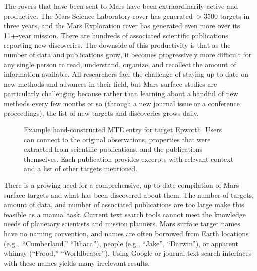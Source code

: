 \documentclass[letterpaper]{article}
\begin{document}
The rovers that have been sent to Mars have been extraordinarily
active and productive.  The Mars Science Laboratory rover has
generated $>3500$ targets in three years, and the Mars Exploration
rover has generated even more over its 11+-year mission.  There are
hundreds of associated scientific publications reporting new
discoveries.  The downside of this productivity is that as the number
of data and publications grow, it becomes progressively more difficult
for any single person to read, understand, organize, and recollect the
amount of information available.  All researchers face the challenge
of staying up to date on new methods and advances in their field, but
Mars surface studies are particularly challenging because rather than
learning about a handful of new methods every few months or so
(through a new journal issue or a conference proceedings), the list of
new targets and discoveries grows daily.

\begin{figure}
\centerline{}
\caption{Example hand-constructed MTE entry for target
Epworth. Users can connect to the original observations, properties
that were extracted from scientific publications, and the publications
themselves.  Each publication provides excerpts with relevant context
and a list of other targets mentioned.}
\label{fig:epworth}
\end{figure}

There is a growing need for a comprehensive, up-to-date compilation of
Mars surface targets and what has been discovered about them.  The
number of targets, amount of data, and number of associated
publications are too large make this feasible as a manual task.
%
Current text search tools cannot meet the knowledge needs of planetary
scientists and mission planners.  Mars surface target names have no
naming convention, and names are often borrowed from Earth locations
(e.g.,~``Cumberland,'' ``Ithaca''), people (e.g., ``Jake'',
``Darwin''), or apparent whimsy (``Frood,'' ``Worldbeater'').  Using
Google or journal text search interfaces with these names yields many
irrelevant results.
\end{document}
